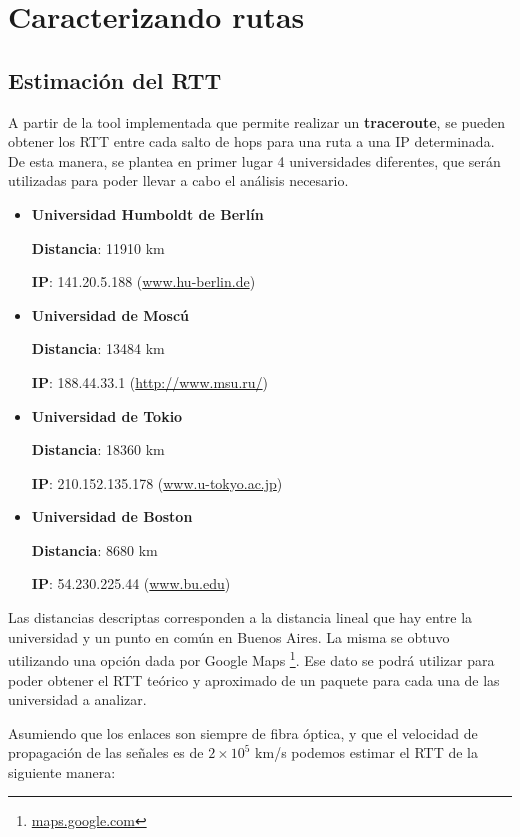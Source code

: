 \section{Caracterizando rutas}

\subsection{Estimación del RTT}
A partir de la tool implementada que permite realizar un \textbf{traceroute}, se pueden obtener los RTT entre cada salto de hops para una ruta a una IP determinada. De esta manera, se plantea en primer lugar 4 universidades diferentes, que serán utilizadas para poder llevar a cabo el análisis necesario.

\begin{itemize}
 \item {\bf Universidad Humboldt de Berlín}

	{\bf Distancia}: 11910 km

	{\bf IP}: 141.20.5.188 (\url{www.hu-berlin.de}{})

 \item {\bf Universidad de Moscú}

	{\bf Distancia}: 13484 km

	{\bf IP}: 188.44.33.1 (\url{http://www.msu.ru/}{})

 \item {\bf Universidad de Tokio}

	{\bf Distancia}: 18360 km

	{\bf IP}: 210.152.135.178 (\url{www.u-tokyo.ac.jp}{})

 \item {\bf Universidad de Boston}

	{\bf Distancia}: 8680 km

	{\bf IP}: 54.230.225.44 (\url{www.bu.edu}{})

\end{itemize}

Las distancias descriptas corresponden a la distancia lineal que hay entre la universidad y un punto en común en Buenos Aires. La misma se obtuvo utilizando una opción dada por Google Maps \footnote{\url{maps.google.com}{}}. Ese dato se podrá utilizar para poder obtener el RTT teórico y aproximado de un paquete para cada una de las universidad a analizar.

Asumiendo que los enlaces son siempre de fibra óptica, y que el velocidad de propagación de las señales es de $2 \times 10^{5}$ km/s podemos estimar el RTT de la siguiente manera:

